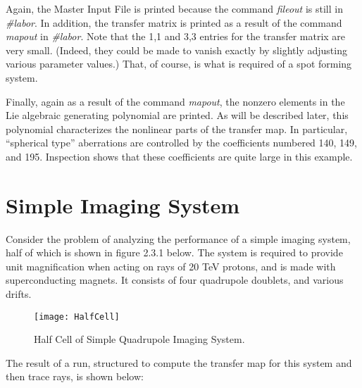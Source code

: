      Again, the Master Input File is printed because the command {\em fileout } is
still in {\em \#labor}.  In addition, the transfer matrix is printed as a result
of the command {\em mapout } in {\em \#labor}.  Note that the 1,1 and 3,3 entries for the
transfer matrix are very small.  (Indeed, they could be made to vanish
exactly by slightly adjusting various parameter values.)  That, of course,
is what is required of a spot forming system.

Finally, again as a result of the command {\em mapout}, the nonzero elements
in the Lie algebraic generating polynomial are printed.  As will be
described later, this polynomial characterizes the nonlinear parts of the
transfer map. In particular, ``spherical type'' aberrations are controlled by
the coefficients numbered 140, 149, and 195.  Inspection shows that these
coefficients are quite large in this example.

\section{Simple Imaging System}
\label{simpleimage}
     Consider the problem of analyzing the performance of a simple imaging
system, half of which is shown in figure 2.3.1 below.  The system is
required to provide unit magnification when acting on rays of 20 TeV
protons, and is made with superconducting magnets.  It consists of four
quadrupole doublets, and various drifts.
\pagebreak


\begin{figure}[htb]
  \centering
  \texttt{[image: HalfCell]}
  \caption{Half Cell of Simple Quadrupole Imaging System.}
\end{figure}

The result of a  run, structured to compute the transfer
map for this system and then trace rays, is shown below:

